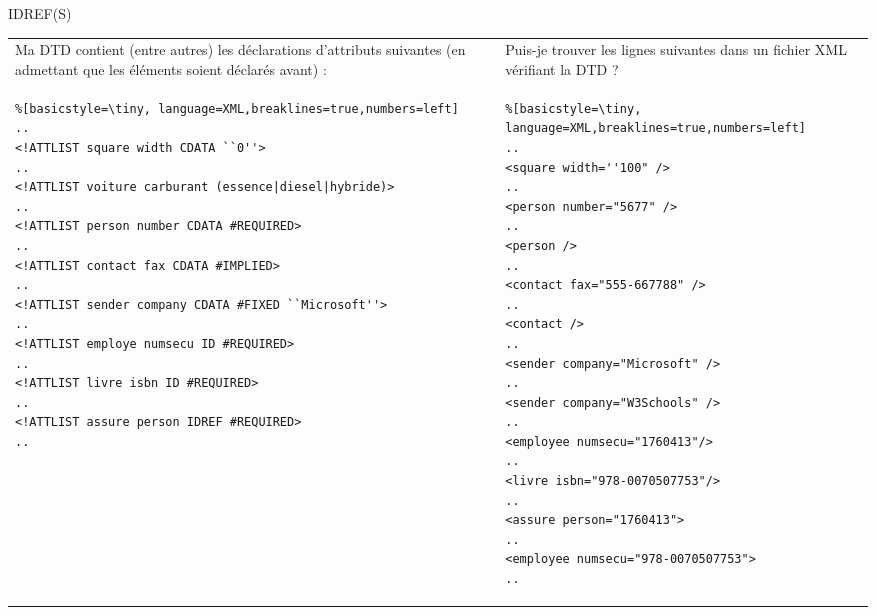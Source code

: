 \begin{frame}{IDREF(S)}
\lstset{numbers=left, basicstyle=\tiny}
\begin{tabular}{p{5.5cm} l p{4cm}}
Ma DTD contient (entre autres) les déclarations d'attributs suivantes (en admettant que les éléments soient déclarés avant) :
& &
Puis-je trouver les lignes suivantes dans un fichier XML vérifiant la DTD ?
\\
\begin{minipage}{0.5\textwidth}
\begin{lstlisting}%[basicstyle=\tiny, language=XML,breaklines=true,numbers=left]
..
<!ATTLIST square width CDATA ``0''>
..
<!ATTLIST voiture carburant (essence|diesel|hybride)> 
..
<!ATTLIST person number CDATA #REQUIRED>
..
<!ATTLIST contact fax CDATA #IMPLIED>
..
<!ATTLIST sender company CDATA #FIXED ``Microsoft''>
..
<!ATTLIST employe numsecu ID #REQUIRED>
..
<!ATTLIST livre isbn ID #REQUIRED>
..
<!ATTLIST assure person IDREF #REQUIRED>
..
\end{lstlisting}
\end{minipage}
& &
\begin{minipage}{0.35\textwidth}
\begin{lstlisting}%[basicstyle=\tiny, language=XML,breaklines=true,numbers=left]
..
<square width=''100" />
..
<person number="5677" />
..
<person />
..
<contact fax="555-667788" />
..
<contact />
..
<sender company="Microsoft" />
..
<sender company="W3Schools" />
..
<employee numsecu="1760413"/>
..
<livre isbn="978-0070507753"/>
..
<assure person="1760413">
..
<employee numsecu="978-0070507753">
..
\end{lstlisting}
\end{minipage}
\end{tabular}

\end{frame}

